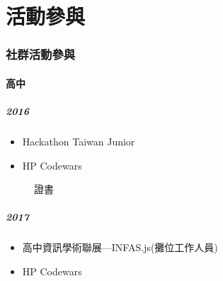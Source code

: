 \documentclass[classical]{einfart}
\providecommand{\tightlist}{%
  \setlength{\itemsep}{0pt}\setlength{\parskip}{0pt}}
\begin{document}
\newpage
\part{活動參與}

\section{社群活動參與}

\subsection{高中}

\subsubsection*{2016}

\begin{itemize}
\tightlist
\item
  Hackathon Taiwan Junior
\item
  HP Codewars
\end{itemize}

\begin{figure}[H]
    \centering
    \caption{證書}
\end{figure}

\subsubsection*{2017}

\begin{itemize}
\tightlist
\item
  高中資訊學術聯展---INFAS.js(攤位工作人員)
\item
  HP Codewars
\end{itemize}
\end{document}
